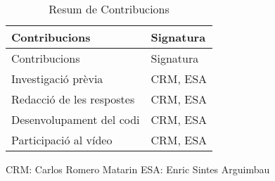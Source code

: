 \documentclass[
]{article}
\begin{document}
\begin{longtable}[]{@{}ll@{}}
\caption{Resum de Contribucions}\tabularnewline
\toprule\noalign{}
Contribucions & Signatura \\
\midrule\noalign{}
\endfirsthead
\toprule\noalign{}
Contribucions & Signatura \\
\midrule\noalign{}
\endhead
\bottomrule\noalign{}
\endlastfoot
Investigació prèvia & CRM, ESA \\
Redacció de les respostes & CRM, ESA \\
Desenvolupament del codi & CRM, ESA \\
Participació al vídeo & CRM, ESA \\
\end{longtable}

CRM: Carlos Romero Matarin ESA: Enric Sintes Arguimbau
\end{document}
